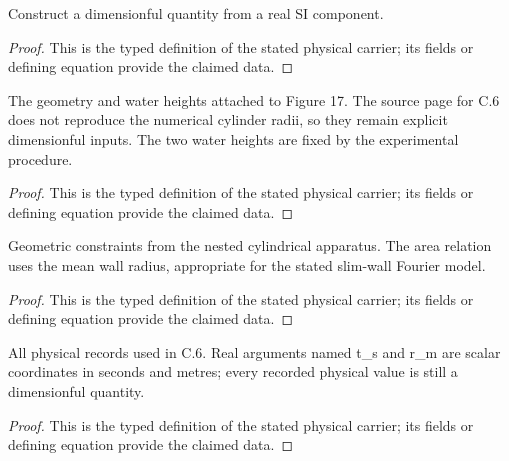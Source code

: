 \begin{definition}
  \label{def:physics:IPhO_2026_4_C_6:aux021}
  Construct a dimensionful quantity from a real SI component.
\end{definition}
\begin{proof}
  This is the typed definition of the stated physical carrier; its fields or defining equation provide the claimed data.
\end{proof}

\begin{definition}
  \label{def:physics:IPhO_2026_4_C_6:aux022}
  The geometry and water heights attached to Figure 17. The source page for C.6 does not reproduce the numerical cylinder radii, so they remain explicit dimensionful inputs. The two water heights are fixed by the experimental procedure.
\end{definition}
\begin{proof}
  This is the typed definition of the stated physical carrier; its fields or defining equation provide the claimed data.
\end{proof}

\begin{definition}
  \label{def:physics:IPhO_2026_4_C_6:aux023}
  Geometric constraints from the nested cylindrical apparatus. The area relation uses the mean wall radius, appropriate for the stated slim-wall Fourier model.
\end{definition}
\begin{proof}
  This is the typed definition of the stated physical carrier; its fields or defining equation provide the claimed data.
\end{proof}

\begin{definition}
  \label{def:physics:IPhO_2026_4_C_6:aux024}
  All physical records used in C.6. Real arguments named t\_s and r\_m are scalar coordinates in seconds and metres; every recorded physical value is still a dimensionful quantity.
\end{definition}
\begin{proof}
  This is the typed definition of the stated physical carrier; its fields or defining equation provide the claimed data.
\end{proof}


